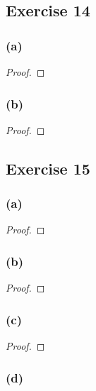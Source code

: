 \documentclass[14pt]{extarticle}
\begin{document}
\subsection{Exercise 14}

\subsubsection{(a)}

\begin{proof}

\end{proof}

\subsubsection{(b)}

\begin{proof}

\end{proof}

\subsection{Exercise 15}

\subsubsection{(a)}

\begin{proof}

\end{proof}

\subsubsection{(b)}

\begin{proof}

\end{proof}

\subsubsection{(c)}

\begin{proof}

\end{proof}

\subsubsection{(d)}
\end{document}
